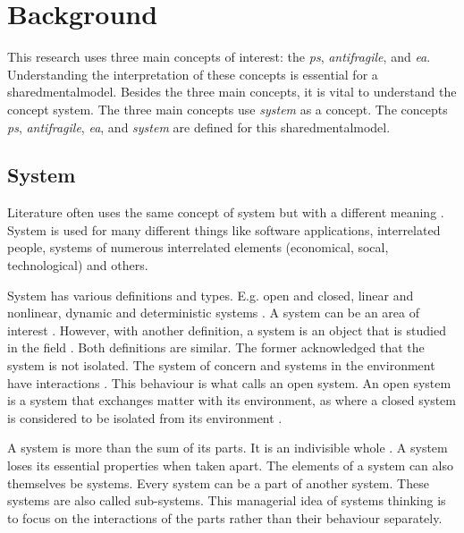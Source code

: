 \chapter{Background}
\label{ch:theoreticalbackground}
This research uses three main concepts of interest: the \textit{\gls{ps}}, \textit{\gls{antifragile}}, and \textit{\acrlong{ea}}. Understanding the interpretation of these concepts is essential for a \gls{sharedmentalmodel}. Besides the three main concepts, it is vital to understand the concept system. The three main concepts use \textit{system} as a concept. The concepts \textit{\gls{ps}}, \textit{\gls{antifragile}}, \textit{\acrlong{ea}}, and \textit{system} are defined for this \gls{sharedmentalmodel}.
\section{System}
\label{sec:tbsystem}
Literature often uses the same concept of system but with a different meaning \parencite[p.~37]{Lapalme2012}. System is used for many different things like software applications, interrelated people, systems of numerous interrelated elements (economical, socal, technological) and others.

System has various definitions and types. E.g. open and closed, linear and nonlinear, dynamic and deterministic systems \parencite{Rickles2007}. A system can be an area of interest \parencite[p.~13]{Mannaert2016}. However, with another definition, a system is an object that is studied in the field \parencite[p.~933]{Rickles2007}. Both definitions are similar. The former acknowledged that the system is not isolated. The system of concern and systems in the environment have interactions \parencite[p.~13--14]{Mannaert2016}. This behaviour is what \textcite[p.~32]{Bertalanffy1968} calls an open system. An open system is a system that exchanges matter with its environment, as where a closed system is considered to be isolated from its environment \parencite[p.~39]{Bertalanffy1968}.

A system is more than the sum of its parts. It is an indivisible whole \parencites[p.~51--69]{Ackoff1964}[p.~664]{Ackoff1973}. A system loses its essential properties when taken apart. The elements of a system can also themselves be systems. Every system can be a part of another system. These systems are also called sub-systems. This managerial idea of systems thinking is to focus on the interactions of the parts rather than their behaviour separately. 

